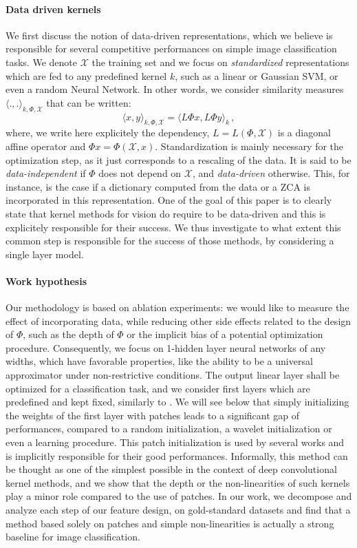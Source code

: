 \documentclass{article} %
\begin{document}
\paragraph{Data driven kernels} We first discuss the notion of  data-driven representations, which we believe is responsible for several competitive performances on simple image classification tasks.  We denote $\mathcal{X}$ the training set and we focus on \textit{standardized} representations which are fed to any predefined kernel $k$, such as a linear or Gaussian SVM, or even a random Neural Network. In other words, we consider similarity measures $\langle .,.\rangle_{k,\Phi,\mathcal{X}}$ that can be written:
\[\langle x,y\rangle_{k,\Phi,\mathcal{X}} =\langle L\Phi x,L\Phi y\rangle_k\, ,\]
where, we write here explicitely the dependency, $L=L(\Phi,\mathcal{X})$ is a diagonal affine operator and $\Phi x= \Phi(\mathcal{X},x)$. Standardization is mainly necessary for the optimization step, as it just corresponds to a rescaling of the data. It is said to be \textit{data-independent} if $\Phi$ does not depend on $\mathcal{X}$, and \textit{data-driven} otherwise. This, for instance, is the case if a dictionary  computed from the data \cite{li2019enhanced,mairal2016end} or a ZCA \cite{shankar2020neural} is incorporated in this representation. One of the goal of this paper is to clearly state that  kernel methods for vision do require to be data-driven and this is explicitely responsible for their success. We thus investigate to what extent this common step is responsible for the success of those methods, by considering a single layer model.

\paragraph{Work hypothesis}Our  methodology is based on ablation experiments: we would like to measure the effect of incorporating data, while reducing other side effects related to the design of $\Phi$, such as the depth of $\Phi$ or the implicit bias of a potential optimization procedure. Consequently, we focus on 1-hidden layer neural networks of any widths, which have favorable properties, like the ability to be a universal approximator under non-restrictive conditions. The output linear layer shall be optimized for a classification task, and we consider first layers which are predefined and kept fixed, similarly to \cite{coates2011analysis}. We will see below that simply initializing the weights of the first layer with patches leads to a significant gap of performances, compared to a random  initialization, a wavelet initialization or even a learning procedure. This patch initialization is used by several works \cite{li2019enhanced,mairal2016end} and is implicitly responsible for their good performances. Informally, this method can be thought as one of the simplest possible in the context of deep convolutional kernel methods, and we show that the depth or the non-linearities of such kernels play a minor role compared to the use of patches. In our work, we decompose and analyze each step of our feature design, on gold-standard datasets and find that a method based solely on patches and simple non-linearities is actually a strong baseline for image classification. 
\end{document}
